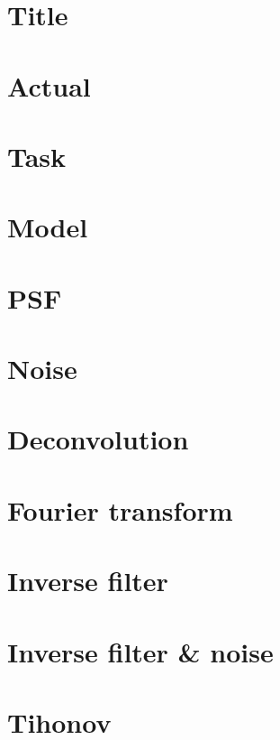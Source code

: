 \documentclass[a5paper,12pt,pdftex]{scrartcl}
\begin{document}
\section{Title }
\vspace*{3cm}
\section{Actual }
\vspace*{3cm}
\section{Task }
\vspace*{3cm}
\section{Model }
\vspace*{3cm}
\section{PSF }
\vspace*{3cm}
\newpage
\section{Noise }
\vspace*{3cm}
\section{Deconvolution }
\vspace*{3cm}
\section{Fourier transform }
\vspace*{3cm}
\section{Inverse filter }
\vspace*{3cm}
\section{Inverse filter \& noise }
\vspace*{3cm}
\newpage
\section{Tihonov }
\vspace*{3cm}
\end{document}

